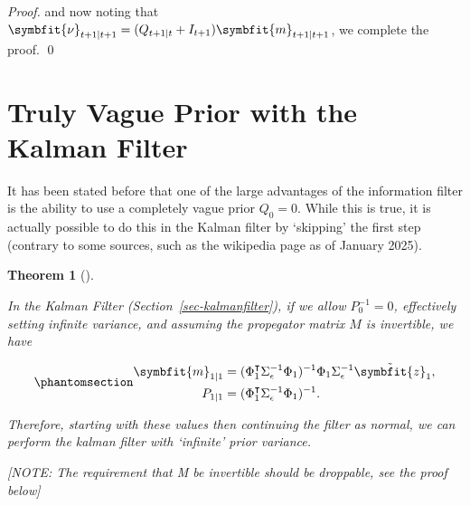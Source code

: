 \documentclass[
]{report}
\newcommand{\bv}[1]{\symbfit{#1}}
\theoremstyle{plain}
\theoremstyle{plain}
\theoremstyle{plain}
\newtheorem{theorem}{Theorem}[section]
\theoremstyle{remark}
\begin{document}
\begin{proof}
and now noting that
\(\bv\nu_{t+1\mid t+1} = (Q_{t+1\mid t} + I_{t+1}) \bv m_{t+1\mid t+1}\),
we complete the proof. \qed
\end{proof}

\section{Truly Vague Prior with the Kalman Filter}\label{sec-vagueprior}

It has been stated before that one of the large advantages of the
information filter is the ability to use a completely vague prior
\(Q_{0}=0\). While this is true, it is actually possible to do this in
the Kalman filter by `skipping' the first step (contrary to some
sources, such as the wikipedia page as of January 2025).

\begin{theorem}[]\protect\hypertarget{thm-vagueprior}{}\label{thm-vagueprior}

In the Kalman Filter (Section~\ref{sec-kalmanfilter}), if we allow
\(P_{0}^{-1} = 0\), effectively setting infinite variance, and assuming
the propegator matrix \(M\) is invertible, we have

\begin{equation}\phantomsection\label{eq-kalmanvague}{\begin{split}
  \bv m_{1\mid1} &= (\Phi_1^\intercal \Sigma_\epsilon^{-1} \Phi_1)^{-1} \Phi_1 \Sigma_\epsilon^{-1} \tilde{\bv z}_1,\\
  P_{1\mid1} &= (\Phi_1^\intercal \Sigma_\epsilon^{-1} \Phi_1)^{-1}.
\end{split}
}\end{equation}

Therefore, starting with these values then continuing the filter as
normal, we can perform the kalman filter with `infinite' prior variance.

{{[}NOTE: The requirement that M be invertible should be droppable, see
the proof below{]}}

\end{theorem}
\end{document}
